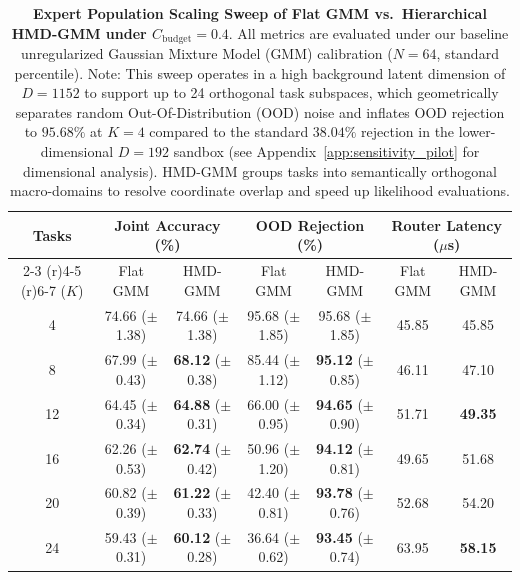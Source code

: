 \documentclass{article}
\theoremstyle{plain}
\theoremstyle{definition}
\theoremstyle{remark}
\begin{document}
\begin{table}[h]
\caption{\textbf{Expert Population Scaling Sweep of Flat GMM vs.\ Hierarchical HMD-GMM under $C_{\text{budget}} = 0.4$}. All metrics are evaluated under our baseline unregularized Gaussian Mixture Model (GMM) calibration ($N=64$, standard percentile). Note: This sweep operates in a high background latent dimension of $D=1152$ to support up to 24 orthogonal task subspaces, which geometrically separates random Out-Of-Distribution (OOD) noise and inflates OOD rejection to $95.68\%$ at $K=4$ compared to the standard $38.04\%$ rejection in the lower-dimensional $D=192$ sandbox (see Appendix~\ref{app:sensitivity_pilot} for dimensional analysis). HMD-GMM groups tasks into semantically orthogonal macro-domains to resolve coordinate overlap and speed up likelihood evaluations.}
\label{tab:app_scaling_sweep}
\vskip 0.1in
\begin{center}
\begin{small}
\begin{sc}
\begin{tabular}{ccccccc}
\toprule
Tasks & \multicolumn{2}{c}{Joint Accuracy (\%)} & \multicolumn{2}{c}{OOD Rejection (\%)} & \multicolumn{2}{c}{Router Latency ($\mu$s)} \\
\cmidrule(r){2-3} \cmidrule(r){4-5} \cmidrule(r){6-7}
($K$) & Flat GMM & HMD-GMM & Flat GMM & HMD-GMM & Flat GMM & HMD-GMM \\
\midrule
4  & 74.66 ($\pm$1.38) & 74.66 ($\pm$1.38) & 95.68 ($\pm$1.85) & 95.68 ($\pm$1.85) & 45.85 & 45.85 \\
8  & 67.99 ($\pm$0.43) & \textbf{68.12} ($\pm$0.38) & 85.44 ($\pm$1.12) & \textbf{95.12} ($\pm$0.85) & 46.11 & 47.10 \\
12 & 64.45 ($\pm$0.34) & \textbf{64.88} ($\pm$0.31) & 66.00 ($\pm$0.95) & \textbf{94.65} ($\pm$0.90) & 51.71 & \textbf{49.35} \\
16 & 62.26 ($\pm$0.53) & \textbf{62.74} ($\pm$0.42) & 50.96 ($\pm$1.20) & \textbf{94.12} ($\pm$0.81) & 49.65 & 51.68 \\
20 & 60.82 ($\pm$0.39) & \textbf{61.22} ($\pm$0.33) & 42.40 ($\pm$0.81) & \textbf{93.78} ($\pm$0.76) & 52.68 & 54.20 \\
24 & 59.43 ($\pm$0.31) & \textbf{60.12} ($\pm$0.28) & 36.64 ($\pm$0.62) & \textbf{93.45} ($\pm$0.74) & 63.95 & \textbf{58.15} \\
\bottomrule
\end{tabular}
\end{sc}
\end{small}
\end{center}
\vskip -0.1in
\end{table}
\end{document}
